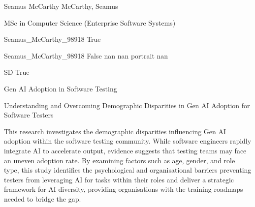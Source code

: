\documentclass[twoside]{report}
\begin{document}
\begingroup{}\relax



\def\Key{Seamus_McCarthy_98918}

{Seamus McCarthy}
{McCarthy, Seamus}

{MSc in Computer Science (Enterprise Software Systems)}

{Seamus_McCarthy_98918}
{True}

{Seamus_McCarthy_98918}
{False}
{nan}
{nan}
{portrait}
{nan}

{SD}
{True}

{Gen AI Adoption in Software Testing}

{Understanding and Overcoming Demographic Disparities in Gen AI Adoption for Software Testers}

{This research investigates the demographic disparities influencing Gen AI adoption within the software testing community. While software engineers rapidly integrate AI to accelerate output, evidence suggests that testing teams may face an uneven adoption rate. By examining factors such as age, gender, and role type, this study identifies the psychological and organisational barriers preventing testers from leveraging AI for tasks within their roles and deliver a strategic framework for AI diversity, providing organisations with the training roadmaps needed to bridge the gap.}
\end{document}
